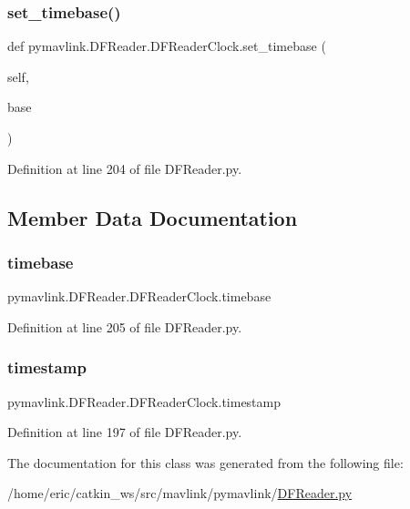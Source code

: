 \subsubsection{\texorpdfstring{set\_timebase()}{set\_timebase()}}
{\footnotesize\ttfamily def pymavlink.\+D\+F\+Reader.\+D\+F\+Reader\+Clock.\+set\+\_\+timebase (\begin{DoxyParamCaption}\item[{}]{self,  }\item[{}]{base }\end{DoxyParamCaption})}



Definition at line 204 of file D\+F\+Reader.\+py.



\subsection{Member Data Documentation}
\mbox{\label{classpymavlink_1_1DFReader_1_1DFReaderClock_a883d452615664051a5dd91788a21ee03}} 
\subsubsection{\texorpdfstring{timebase}{timebase}}
{\footnotesize\ttfamily pymavlink.\+D\+F\+Reader.\+D\+F\+Reader\+Clock.\+timebase}



Definition at line 205 of file D\+F\+Reader.\+py.

\mbox{\label{classpymavlink_1_1DFReader_1_1DFReaderClock_abb110022a8a9204b253bd884ac9a5e13}} 
\subsubsection{\texorpdfstring{timestamp}{timestamp}}
{\footnotesize\ttfamily pymavlink.\+D\+F\+Reader.\+D\+F\+Reader\+Clock.\+timestamp}



Definition at line 197 of file D\+F\+Reader.\+py.



The documentation for this class was generated from the following file\+:\begin{DoxyCompactItemize}
\item 
/home/eric/catkin\+\_\+ws/src/mavlink/pymavlink/\mbox{\hyperlink{DFReader_8py}{D\+F\+Reader.\+py}}\end{DoxyCompactItemize}
